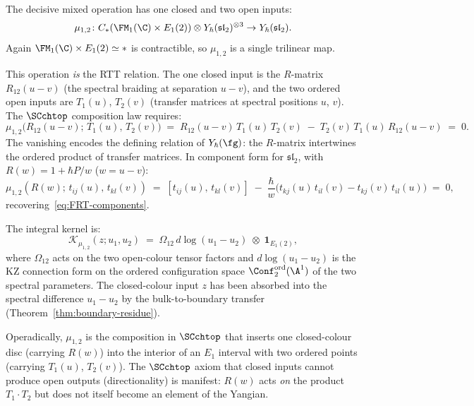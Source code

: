\begin{computation}
\label{comp:mu12-RTT}
The decisive mixed operation has one closed and two open inputs:
\[
\mu_{1,2} \colon C_*(\FM_1(\C) \times E_1(2)) \otimes
Y_\hbar(\mathfrak{sl}_2)^{\otimes 3} \to
Y_\hbar(\mathfrak{sl}_2).
\]
Again $\FM_1(\C) \times E_1(2) \simeq *$ is contractible, so
$\mu_{1,2}$ is a single trilinear map.

This operation \emph{is} the RTT relation. The one closed
input is the $R$-matrix $R_{12}(u - v)$ (the spectral braiding
at separation $u - v$), and the two ordered open inputs are
$T_1(u)$, $T_2(v)$ (transfer matrices at spectral positions
$u$, $v$). The $\SCchtop$ composition law requires:
\begin{equation}\label{eq:mu12-RTT}
\boxed{
\mu_{1,2}\bigl(R_{12}(u{-}v);\, T_1(u),\, T_2(v)\bigr)
\;=\;
R_{12}(u{-}v)\,T_1(u)\,T_2(v)
\;-\;
T_2(v)\,T_1(u)\,R_{12}(u{-}v)
\;=\; 0.
}
\end{equation}
The vanishing encodes the defining relation of $Y_\hbar(\fg)$:
the $R$-matrix intertwines the ordered product of transfer
matrices. In component form for $\mathfrak{sl}_2$, with
$R(w) = 1 + \hbar P/w$ \textup($w = u - v$\textup):
\[
\mu_{1,2}(R(w);\, t_{ij}(u),\, t_{kl}(v))
\;=\;
[t_{ij}(u),\, t_{kl}(v)]
\;-\;
\frac{\hbar}{w}\bigl(
 t_{kj}(u)\,t_{il}(v) - t_{kj}(v)\,t_{il}(u)
\bigr)
\;=\; 0,
\]
recovering~\eqref{eq:FRT-components}.

The integral kernel is:
\begin{equation}\label{eq:mu12-kernel}
\mathcal{K}_{\mu_{1,2}}(z; u_1, u_2)
\;=\;
\Omega_{12}\,d\log(u_1 - u_2)
\;\otimes\; \mathbf{1}_{E_1(2)},
\end{equation}
where $\Omega_{12}$ acts on the two open-colour tensor factors
and $d\log(u_1 - u_2)$ is the KZ connection form on the ordered
configuration space $\Conf_2^{\mathrm{ord}}(\A^1)$ of the two
spectral parameters. The closed-colour input $z$ has been
absorbed into the spectral difference $u_1 - u_2$ by
the bulk-to-boundary transfer
(Theorem~\ref{thm:boundary-residue}).

Operadically, $\mu_{1,2}$ is the composition in $\SCchtop$
that inserts one closed-colour disc (carrying $R(w)$)
into the interior of an $E_1$ interval with two ordered points
(carrying $T_1(u)$, $T_2(v)$). The $\SCchtop$ axiom
that closed inputs cannot produce open outputs
(directionality) is manifest: $R(w)$ acts \emph{on}
the product $T_1 \cdot T_2$ but does not itself become an
element of the Yangian.
\end{computation}

